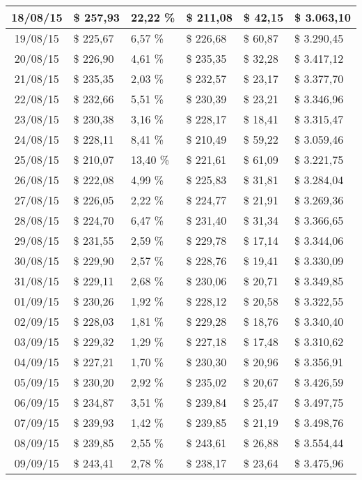 \begin{small}
\begin{longtable}{|c|l|l|l|l|l|}
18/08/15 & \$ 257,93 & 22,22 \% & \$ 211,08 & \$ 42,15 & \$ 3.063,10 \\ \hline
19/08/15 & \$ 225,67 & 6,57 \% & \$ 226,68 & \$ 60,87 & \$ 3.290,45 \\ \hline
20/08/15 & \$ 226,90 & 4,61 \% & \$ 235,35 & \$ 32,28 & \$ 3.417,12 \\ \hline
21/08/15 & \$ 235,35 & 2,03 \% & \$ 232,57 & \$ 23,17 & \$ 3.377,70 \\ \hline
22/08/15 & \$ 232,66 & 5,51 \% & \$ 230,39 & \$ 23,21 & \$ 3.346,96 \\ \hline
23/08/15 & \$ 230,38 & 3,16 \% & \$ 228,17 & \$ 18,41 & \$ 3.315,47 \\ \hline
24/08/15 & \$ 228,11 & 8,41 \% & \$ 210,49 & \$ 59,22 & \$ 3.059,46 \\ \hline
25/08/15 & \$ 210,07 & 13,40 \% & \$ 221,61 & \$ 61,09 & \$ 3.221,75 \\ \hline
26/08/15 & \$ 222,08 & 4,99 \% & \$ 225,83 & \$ 31,81 & \$ 3.284,04 \\ \hline
27/08/15 & \$ 226,05 & 2,22 \% & \$ 224,77 & \$ 21,91 & \$ 3.269,36 \\ \hline
28/08/15 & \$ 224,70 & 6,47 \% & \$ 231,40 & \$ 31,34 & \$ 3.366,65 \\ \hline
29/08/15 & \$ 231,55 & 2,59 \% & \$ 229,78 & \$ 17,14 & \$ 3.344,06 \\ \hline
30/08/15 & \$ 229,90 & 2,57 \% & \$ 228,76 & \$ 19,41 & \$ 3.330,09 \\ \hline
31/08/15 & \$ 229,11 & 2,68 \% & \$ 230,06 & \$ 20,71 & \$ 3.349,85 \\ \hline
01/09/15 & \$ 230,26 & 1,92 \% & \$ 228,12 & \$ 20,58 & \$ 3.322,55 \\ \hline
02/09/15 & \$ 228,03 & 1,81 \% & \$ 229,28 & \$ 18,76 & \$ 3.340,40 \\ \hline
03/09/15 & \$ 229,32 & 1,29 \% & \$ 227,18 & \$ 17,48 & \$ 3.310,62 \\ \hline
04/09/15 & \$ 227,21 & 1,70 \% & \$ 230,30 & \$ 20,96 & \$ 3.356,91 \\ \hline
05/09/15 & \$ 230,20 & 2,92 \% & \$ 235,02 & \$ 20,67 & \$ 3.426,59 \\ \hline
06/09/15 & \$ 234,87 & 3,51 \% & \$ 239,84 & \$ 25,47 & \$ 3.497,75 \\ \hline
07/09/15 & \$ 239,93 & 1,42 \% & \$ 239,85 & \$ 21,19 & \$ 3.498,76 \\ \hline
08/09/15 & \$ 239,85 & 2,55 \% & \$ 243,61 & \$ 26,88 & \$ 3.554,44 \\ \hline
09/09/15 & \$ 243,41 & 2,78 \% & \$ 238,17 & \$ 23,64 & \$ 3.475,96 \\ \hline

\end{longtable}
\end{small}

